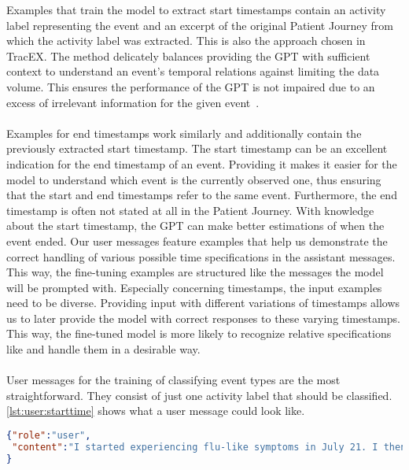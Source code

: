 Examples that train the model to extract start timestamps contain an activity label representing the event and an excerpt of the original Patient Journey from which the activity label was extracted. This is also the approach chosen in TracEX. The method delicately balances providing the GPT with sufficient context to understand an event's temporal relations against limiting the data volume. This ensures the performance of the GPT is not impaired due to an excess of irrelevant information for the given event~\cite{han_is_2023}.\\\\
Examples for end timestamps work similarly and additionally contain the previously extracted start timestamp. The start timestamp can be an excellent indication for the end timestamp of an event. Providing it makes it easier for the model to understand which event is the currently observed one, thus ensuring that the start and end timestamps refer to the same event. Furthermore, the end timestamp is often not stated at all in the Patient Journey. With knowledge about the start timestamp, the GPT can make better estimations of when the event ended. Our user messages feature examples that help us demonstrate the correct handling of various possible time specifications in the assistant messages.\\
This way, the fine-tuning examples are structured like the messages the model will be prompted with. Especially concerning timestamps, the input examples need to be diverse. Providing input with different variations of timestamps allows us to later provide the model with correct responses to these varying timestamps. This way, the fine-tuned model is more likely to recognize relative specifications like  and handle them in a desirable way. \\\\
User messages for the training of classifying event types are the most straightforward. They consist of just one activity label that should be classified.\\
\autoref{lst:user:starttime} shows what a user message could look like.
\begin{lstlisting}[language=json, caption={User message for determining an activities start timestamp}, label={lst:user:starttime}, float=ht]
{"role":"user",
 "content":"I started experiencing flu-like symptoms in July 21. I then got tested positive for Covid19. In October, I got infected again. Then on the 4th of November I got my first dosage of the vaccine. I had heavy side effects. Activity Label: starting to experience symptoms"
}
\end{lstlisting}

